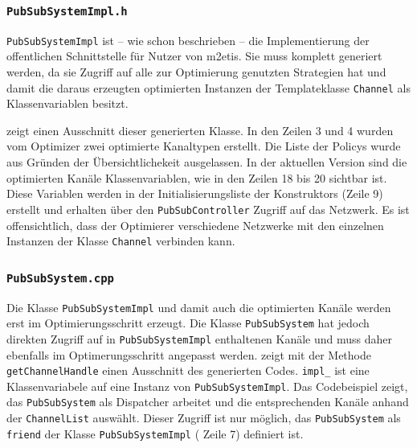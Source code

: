 


\subsubsection*{\texttt{PubSubSystemImpl.h}}
\texttt{PubSubSystemImpl} ist -- wie schon beschrieben -- die Implementierung der offentlichen Schnittstelle für Nutzer von \ac{m2etis}. Sie muss komplett generiert werden, da sie Zugriff auf alle zur Optimierung genutzten Strategien hat und damit die daraus erzeugten optimierten Instanzen der Templateklasse \texttt{Channel} als Klassenvariablen besitzt.

 zeigt einen Ausschnitt dieser generierten Klasse. In den Zeilen 3 und 4 wurden vom Optimizer zwei optimierte Kanaltypen erstellt. Die Liste der Policys wurde aus Gründen der Übersichtlichekeit ausgelassen. In der aktuellen Version sind die optimierten Kanäle Klassenvariablen, wie in den Zeilen 18 bis 20 sichtbar ist.  Diese Variablen werden in der Initialisierungsliste der Konstruktors (Zeile 9) erstellt und erhalten über den \texttt{PubSubController} Zugriff auf das Netzwerk. Es ist offensichtlich, dass der Optimierer verschiedene Netzwerke mit den einzelnen Instanzen der Klasse \texttt{Channel} verbinden kann.




\subsubsection*{\texttt{PubSubSystem.cpp}}
Die Klasse \texttt{PubSubSystemImpl} und damit auch die optimierten Kanäle werden erst im Optimierungsschritt erzeugt. Die Klasse \texttt{PubSubSystem} hat jedoch direkten Zugriff auf in \texttt{PubSubSystemImpl} enthaltenen Kanäle und muss daher ebenfalls im Optimerungsschritt angepasst werden.  zeigt mit der Methode \texttt{getChannelHandle} einen Ausschnitt des generierten Codes. \texttt{impl\_} ist eine Klassenvariabele auf eine Instanz von \texttt{PubSubSystemImpl}. Das Codebeispiel zeigt, das \texttt{PubSubSystem} als Dispatcher arbeitet und die entsprechenden Kanäle anhand der \texttt{ChannelList} auswählt. Dieser Zugriff ist nur möglich, das \texttt{PubSubSystem} als \texttt{friend} der Klasse \texttt{PubSubSystemImpl} ( Zeile 7) definiert ist.

